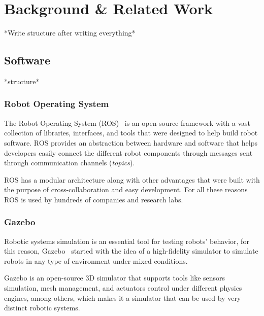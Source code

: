 \chapter{Background \& Related Work}
\label{chap:background}

*Write structure after writing everything*

\section{Software}

*structure*

\subsection{Robot Operating System}
\label{sec:ros}

The Robot Operating System (ROS)~\cite{quigley2009ros} is an open-source framework with a vast collection of libraries, interfaces, and tools that were designed to help build robot software. ROS provides an abstraction between hardware and software that helps developers easily connect the different robot components through messages sent through communication channels (\textit{topics}).

ROS has a modular architecture along with other advantages that were built with the purpose of cross-collaboration and easy development. For all these reasons ROS is used by hundreds of companies and research labs.

\subsection{Gazebo}
\label{sec:gazebo}

Robotic systems simulation is an essential tool for testing robots' behavior, for this reason, Gazebo~\cite{koenig2004design} started with the idea of a high-fidelity simulator to simulate robots in any type of environment under mixed conditions.

Gazebo is an open-source 3D simulator that supports tools like sensors simulation, mesh management, and actuators control under different physics engines, among others, which makes it a simulator that can be used by very distinct robotic systems.


